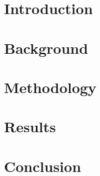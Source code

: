 \documentclass[a4paper,twoside]{article}
\begin{document}
\onecolumn \maketitle \normalsize \setcounter{footnote}{0} \vfill


\section{Introduction}
\label{sec:introduction}


\section{Background}
\label{sec:relatedwork}


\section{Methodology}
\label{sec:methodology}


\section{Results}
\label{sec:results}


\section{Conclusion}
\label{sec:conclusion}






{\small
}

\end{document}
